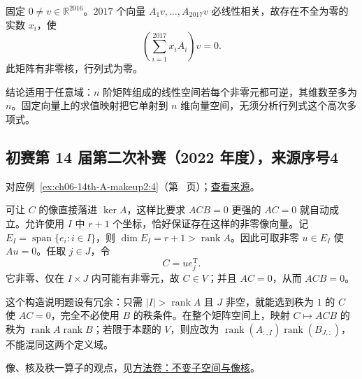 \documentclass[12pt,fontset=fandol]{ctexart}
\begin{document}
\begin{solve}

固定 $0\ne v\in\mathbb R^{2016}$。$2017$ 个向量 $A_1v,\ldots,A_{2017}v$ 必线性相关，故存在不全为零的实数 $x_i$，使
\[
\left(\sum_{i=1}^{2017}x_iA_i\right)v=0.
\]
此矩阵有非零核，行列式为零。

\end{solve}

\begin{remark}[方法与条件]

结论适用于任意域：$n$ 阶矩阵组成的线性空间若每个非零元都可逆，其维数至多为 $n$。固定向量上的求值映射把它单射到 $n$ 维向量空间，无须分析行列式这个高次多项式。

\end{remark}

\subsection{初赛第 14 届第二次补赛（2022 年度），来源序号4}\label{ans:ch06-14th-A-makeup2:4}\label{pr:ch06-14th-A-makeup2:4}

对应例~\ref{ex:ch06-14th-A-makeup2:4}（第~\pageref{ex:ch06-14th-A-makeup2:4} 页）；\href{https://github.com/lzxcr/cmc-mathematics/blob/64916fa1fdbc3e444a652eca204d5669058ee321/src/problems/preliminary/14-makeup2/04.md}{查看来源}。

\begin{solve}

可让 $C$ 的像直接落进 $\ker A$，这样比要求 $ACB=0$ 更强的 $AC=0$ 就自动成立。允许使用 $I$ 中 $r+1$ 个坐标，恰好保证存在这样的非零像向量。记 $E_I=\operatorname{span}\{e_i:i\in I\}$，则 $\dim E_I=r+1>\operatorname{rank}A$。因此可取非零 $u\in E_I$ 使 $Au=0$。任取 $j\in J$，令
\[
C=ue_j^{\mathrm T}.
\]
它非零、仅在 $I\times J$ 内可能有非零元，故 $C\in V$；并且 $AC=0$，从而 $ACB=0$。

\end{solve}

\begin{remark}[方法与条件]

这个构造说明题设有冗余：只需 $|I|>\operatorname{rank}A$ 且 $J$ 非空，就能选到秩为 $1$ 的 $C$ 使 $AC=0$，完全不必使用 $B$ 的秩条件。在整个矩阵空间上，映射 $C\mapsto ACB$ 的秩为 $\operatorname{rank}A\operatorname{rank}B$；若限于本题的 $V$，则应改为 $\operatorname{rank}(A_{:,I})\operatorname{rank}(B_{J,:})$，不能混同这两个定义域。

像、核及秩一算子的观点，见\hyperref[app:linear-invariant]{方法卷：不变子空间与像核}。

\end{remark}
\end{document}
